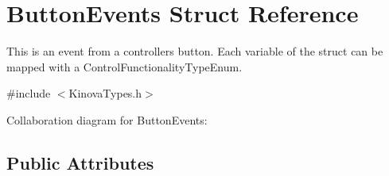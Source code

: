 \hypertarget{struct_button_events}{}\section{Button\+Events Struct Reference}
\label{struct_button_events}


This is an event from a controller\textquotesingle{}s button. Each variable of the struct can be mapped with a Control\+Functionality\+Type\+Enum.  




{\ttfamily \#include $<$Kinova\+Types.\+h$>$}



Collaboration diagram for Button\+Events\+:
\subsection*{Public Attributes}
